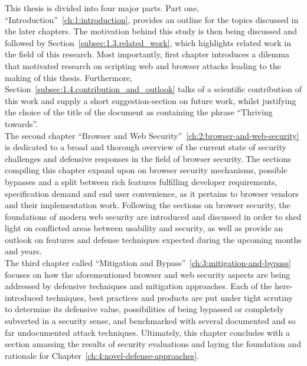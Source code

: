   This thesis is divided into four major parts. Part one, ``Introduction''~\ref{ch:1:introduction}, provides an outline for the topics discussed in the later chapters. The motivation behind this study is then being discussed and followed by Section~\ref{subsec:1.3.related_work}, which highlights related work in the field of this research.  Most importantly, first chapter introduces a dilemma that motivated research on scripting web and browser attacks leading to the making of this thesis. Furthermore, Section~\ref{subsec:1.4.contribution_and_outlook} talks of a scientific contribution of this work and supply a short suggestion-section on future work, whilst justifying the choice of the title of the document as containing the phrase ``Thriving towards''.\\

  The second chapter ``Browser and Web Security''~\ref{ch:2:browser-and-web-security} is dedicated to a broad and thorough overview of the current state of security challenges and defensive responses in the field of browser security. The sections compiling this chapter expand upon on browser security mechanisms, possible bypasses and a split between rich features fulfilling developer requirements, specification demand and end user convenience, as it pertains to browser vendors and their implementation work. Following the sections on browser security, the foundations of modern web security are introduced and discussed in order to shed light on conflicted areas between usability and security, as well as provide an outlook on features and defense techniques expected during the upcoming months and years.\\

  The third chapter called ``Mitigation and Bypass''~\ref{ch:3:mitigation-and-bypass} focuses on how the aforementioned browser and web security aspects are being addressed by defensive techniques and mitigation approaches. Each of the here-introduced techniques, best practices and products are put under tight scrutiny to determine its defensive value, possibilities of being bypassed or completely subverted in a security sense, and benchmarked with several documented and so far undocumented attack techniques. Ultimately, this chapter concludes with a section amassing the results of security evaluations and laying the foundation and rationale for Chapter~\ref{ch:4:novel-defense-approaches}.\\

